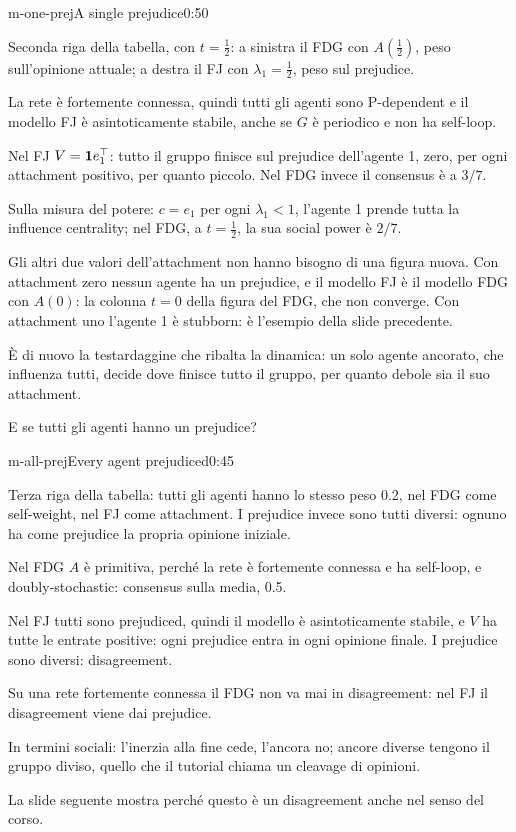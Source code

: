 \begin{slide}{m-one-prej}{A single prejudice}{0:50}
  \begin{discorso}
    \item Seconda riga della tabella, con $t=\tfrac12$: a sinistra il FDG con $A(\tfrac12)$, peso sull'opinione attuale; a destra il FJ con $\lambda_1=\tfrac12$, peso sul prejudice.
    \item La rete è fortemente connessa, quindi tutti gli agenti sono P-dependent e il modello FJ è asintoticamente stabile, anche se $G$ è periodico e non ha self-loop.
    \item Nel FJ $V=\mathbf{1} e_1^\top$: tutto il gruppo finisce sul prejudice dell'agente 1, zero, per ogni attachment positivo, per quanto piccolo. Nel FDG invece il consensus è a $3/7$.
    \item Sulla misura del potere: $c=e_1$ per ogni $\lambda_1<1$, l'agente 1 prende tutta la influence centrality; nel FDG, a $t=\tfrac12$, la sua social power è $2/7$.
    \item {\color{blue}Gli altri due valori dell'attachment non hanno bisogno di una figura nuova. Con attachment zero nessun agente ha un prejudice, e il modello FJ è il modello FDG con $A(0)$: la colonna $t=0$ della figura del FDG, che non converge. Con attachment uno l'agente 1 è stubborn: è l'esempio della slide precedente.}
    \item È di nuovo la testardaggine che ribalta la dinamica: un solo agente ancorato, che influenza tutti, decide dove finisce tutto il gruppo, per quanto debole sia il suo attachment.
    \item E se tutti gli agenti hanno un prejudice?
  \end{discorso}
\end{slide}

\begin{slide}{m-all-prej}{Every agent prejudiced}{0:45}
  \begin{discorso}
    \item Terza riga della tabella: tutti gli agenti hanno lo stesso peso 0.2, nel FDG come self-weight, nel FJ come attachment. I prejudice invece sono tutti diversi: ognuno ha come prejudice la propria opinione iniziale.
    \item Nel FDG $A$ è primitiva, perché la rete è fortemente connessa e ha self-loop, e doubly-stochastic: consensus sulla media, 0.5.
    \item Nel FJ tutti sono prejudiced, quindi il modello è asintoticamente stabile, e $V$ ha tutte le entrate positive: ogni prejudice entra in ogni opinione finale. I prejudice sono diversi: disagreement.
    \item Su una rete fortemente connessa il FDG non va mai in disagreement: nel FJ il disagreement viene dai prejudice.
    \item In termini sociali: l'inerzia alla fine cede, l'ancora no; ancore diverse tengono il gruppo diviso, quello che il tutorial chiama un cleavage di opinioni.
    \item La slide seguente mostra perché questo è un disagreement anche nel senso del corso.
  \end{discorso}
\end{slide}

